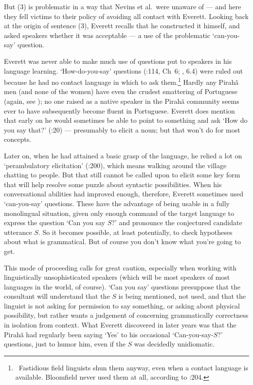 \documentclass[output=paper,colorlinks,citecolor=brown
]{langscibook}
\begin{document}
But (3) is problematic in a way that Nevins et al.\ were unaware
of --- and here they fell victims to their policy of avoiding all contact
with Everett. Looking back at the origin of sentence (3), Everett recalls
that he constructed it himself, and asked speakers whether it was
acceptable --- a use of the problematic `can-you-say' question.

Everett was never able to make much use of questions put to speakers
in his language learning.  `How-do-you-say' questions
(\citealt{Samarin67}:114, Ch~6; \citealt{SakeEver12},
{\textsection}6.4) were ruled out because he had no contact language in
which to ask them.\footnote{\,
   Fastidious field linguists shun them anyway, even when a contact language
   is available. Bloomfield never used them at all, according to
   \citealt{Voegelin60}:204.}
Hardly any Pirah{\~a} men (and none of the women) have even the crudest
smattering of Portuguese (again, see \citealt{Sakel12}); no one raised
as a native speaker in the Pirah{\~a} community seems ever to have
subsequently become fluent in Portuguese. Everett does mention that
early on he would sometimes be able to point to something and ask
`How do you say that?' (\citealt{Everett08}:20) --- presumably
to elicit a noun; but that won't do for most concepts.

Later on, when he had attained a basic grasp of the language, he relied
a lot on `perambulatory elicitation' (\citealt{Everett86HAL}:200), which
means walking around the village chatting to people. But that still
cannot be called upon to elicit some key form that will help resolve
some puzzle about syntactic possibilities. When his conversational
abilities had improved enough, therefore, Everett sometimes used
`can-you-say' questions. These have the advantage of being usable in
a fully monolingual situation, given only enough command of the target
language to express the question `Can you say $S$?' and pronounce the
conjectured candidate utterance $S$. So it becomes possible, at least
potentially, to check hypotheses about what is grammatical. But of
course you don't know what you're going to get.

This mode of proceeding calls for great caution, especially when
working with linguistically unsophisticated speakers (which will be
most speakers of most languages in the world, of course). `Can you say'
questions presuppose that the consultant will understand that the $S$
is being mentioned, not used, and that the linguist is not asking
for permission to say something, or asking about physical possibility,
but rather wants a judgement of concerning grammatically correctness
in isolation from context. What Everett discovered in later years was
that the Pirah{\~a} had regularly been saying `Yes' to his occasional
`Can-you-say-$S$?' questions, just to humor him, even if the $S$ was
decidedly unidiomatic.
\end{document}
